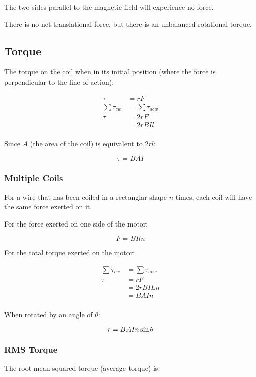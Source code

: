 \documentclass[a4paper,11pt]{report}
\begin{document}
The two sides parallel to the magnetic field will experience no force.

There is no net translational force, but there is an unbalanced rotational
torque.

\subsection{Torque}

The torque on the coil when in its initial position (where the force is
perpendicular to the line of action):

$$
\begin{aligned}
\tau & = rF \\
\sum \tau_{cw} & = \sum \tau_{acw} \\
\tau & = 2rF \\
& = 2rBIl \\
\end{aligned}
$$

Since $A$ (the area of the coil) is equivalent to $2rl$:

$$
\tau = BAI
$$

\subsubsection{Multiple Coils}

For a wire that has been coiled in a rectanglar shape $n$ times, each coil will
have the same force exerted on it.

For the force exerted on one side of the motor:

$$
F = BIln
$$

For the total torque exerted on the motor:

$$
\begin{aligned}
\sum \tau_{cw} & = \sum \tau_{acw} \\
\tau & = rF \\
& = 2r BILn \\
& = BAIn \\
\end{aligned}
$$

When rotated by an angle of $\theta$:

$$
\tau = BAIn \sin{\theta} \\
$$

\subsubsection{RMS Torque}

The root mean squared torque (average torque) is:
\end{document}
